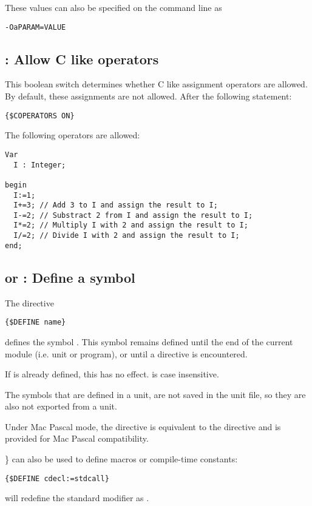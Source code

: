 These values can also be specified on the command line as
\begin{verbatim}
-OaPARAM=VALUE
\end{verbatim}

\subsection{ : Allow C like operators}
This boolean switch determines whether C like assignment operators 
are allowed. By default, these assignments are not allowed.
After the following statement:
\begin{verbatim}
{$COPERATORS ON}
\end{verbatim}
The following operators are allowed:
\begin{verbatim}
Var
  I : Integer;

begin
  I:=1;
  I+=3; // Add 3 to I and assign the result to I;
  I-=2; // Substract 2 from I and assign the result to I;
  I*=2; // Multiply I with 2 and assign the result to I;
  I/=2; // Divide I with 2 and assign the result to I;
end;  
\end{verbatim}

\subsection{ or  : Define a symbol}
The directive
\begin{verbatim}
{$DEFINE name}
\end{verbatim}
defines the symbol . This symbol remains defined until the end of
the current module (i.e. unit or program), or until a  directive is encountered.

If  is already defined, this has no effect.  is case
insensitive.

The symbols that are defined in a unit, are not saved in the unit file,
so they are also not exported from a unit.

Under Mac Pascal mode, the  directive is equivalent to the 
 directive and is provided for Mac Pascal compatibility.

\} can also be used to define macros or compile-time constants:
\begin{verbatim}
{$DEFINE cdecl:=stdcall}
\end{verbatim}
will redefine the standard modifier  as .


